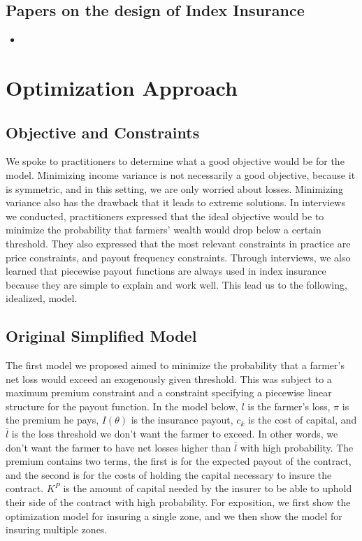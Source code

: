 \documentclass[11pt]{article}
\begin{document}
  \subsection{Papers on the design of Index Insurance}
    \begin{itemize}
        \item \cite{dalhaus2020behavioral}
    \end{itemize}

\section{Optimization Approach}
  \subsection{Objective and Constraints}
    We spoke to practitioners to determine what a good objective would be for the model. Minimizing income variance is not necessarily a good objective, because it is symmetric, and in this setting, we are only worried about losses. Minimizing variance also has the drawback that it leads to extreme solutions. In interviews we conducted, practitioners expressed that the ideal objective would be to minimize the probability that farmers' wealth would drop below a certain threshold. They also expressed that the most relevant constraints in practice are price constraints, and payout frequency constraints. Through interviews, we also learned that piecewise payout functions are always used in index insurance because they are simple to explain and work well. This lead us to the following, idealized, model. 

  \subsection{Original Simplified Model}

    The first model we proposed aimed to minimize the probability that a farmer's net loss would exceed an exogenously given threshold. This was subject to a maximum premium constraint and a constraint specifying a piecewise linear structure for the payout function. In the model below, $l$ is the farmer's loss, $\pi$ is the premium he pays, $I(\theta)$ is the insurance payout, $c_k$ is the cost of capital, and $\bar{l}$ is the loss threshold we don't want the farmer to exceed. In other words, we don't want the farmer to have net losses higher than $\bar{l}$ with high probability. The premium contains two terms, the first is for the expected payout of the contract, and the second is for the costs of holding the capital necessary to insure the contract. $K^P$ is the amount of capital needed by the insurer to be able to uphold their side of the contract with high probability. For exposition, we first show the optimization model for insuring a single zone, and we then show the model for insuring multiple zones. 
    
\end{document}
